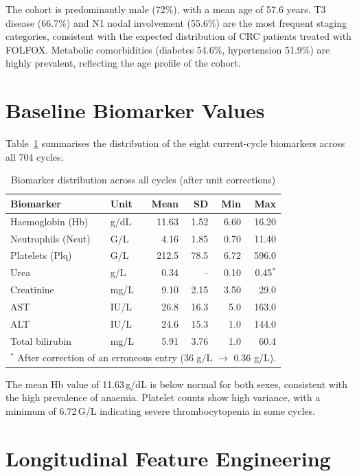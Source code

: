 \documentclass[12pt,a4paper]{report}
\begin{document}
The cohort is predominantly male (72\%), with a mean age of 57.6 years. T3 disease (66.7\%) and N1 nodal involvement (55.6\%) are the most frequent staging categories, consistent with the expected distribution of CRC patients treated with FOLFOX. Metabolic comorbidities (diabetes 54.6\%, hypertension 51.9\%) are highly prevalent, reflecting the age profile of the cohort.

\section{Baseline Biomarker Values}

Table~\ref{tab:bio} summarises the distribution of the eight current-cycle biomarkers across all 704 cycles.

\begin{table}[H]
\centering
\caption{Biomarker distribution across all cycles (after unit corrections)}
\label{tab:bio}
\begin{tabular}{llrrrr}
\toprule
\textbf{Biomarker} & \textbf{Unit} & \textbf{Mean} & \textbf{SD} & \textbf{Min} & \textbf{Max} \\
\midrule
Haemoglobin (Hb) & g/dL & 11.63 & 1.52 & 6.60 & 16.20 \\
Neutrophils (Neut) & G/L & 4.16 & 1.85 & 0.70 & 11.40 \\
Platelets (Plq) & G/L & 212.5 & 78.5 & 6.72 & 596.0 \\
Urea & g/L & 0.34 & -- & 0.10 & 0.45$^{*}$ \\
Creatinine & mg/L & 9.10 & 2.15 & 3.50 & 29.0 \\
AST & IU/L & 26.8 & 16.3 & 5.0 & 163.0 \\
ALT & IU/L & 24.6 & 15.3 & 1.0 & 144.0 \\
Total bilirubin & mg/L & 5.91 & 3.76 & 1.0 & 60.4 \\
\bottomrule
\multicolumn{6}{l}{\small $^{*}$ After correction of an erroneous entry (36 g/L $\to$ 0.36 g/L).}
\end{tabular}
\end{table}

The mean Hb value of 11.63\,g/dL is below normal for both sexes, consistent with the high prevalence of anaemia. Platelet counts show high variance, with a minimum of 6.72\,G/L indicating severe thrombocytopenia in some cycles.

\section{Longitudinal Feature Engineering}
\label{sec:features}
\end{document}
